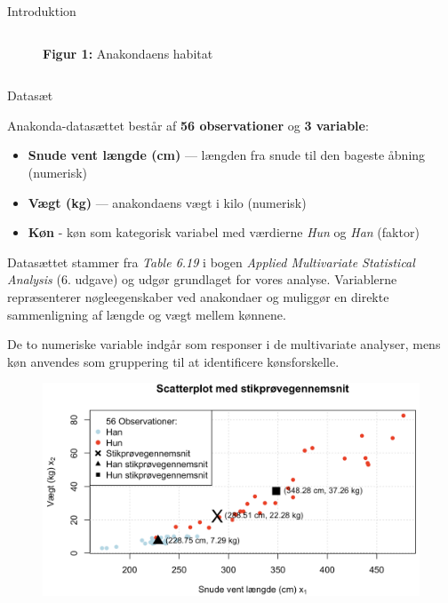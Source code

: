\documentclass[final]{beamer}
\newlength{\colwidth}
\begin{document}
\begin{frame}[t]
\begin{columns}[t]
\begin{column}{\colwidth}
\begin{block}{Introduktion}
\begin{columns}
\begin{column}{0.55\textwidth}
\begin{figure}
      \textbf{\textcolor{junglegreen}{Figur 1:}} Anakondaens habitat
    \end{figure}
  \end{column}



  
\end{columns}
	
  \end{block}
  
  
\vspace{-1em}
\begin{block}{Datasæt}
\justifying

Anakonda-datasættet består af \textbf{56 observationer} og \textbf{3 variable}:


\begin{itemize}
	\item \textbf{Snude vent længde (cm)} — længden fra snude til den bageste åbning  (numerisk)
	\item \textbf{Vægt (kg)} — anakondaens vægt i kilo (numerisk)
	\item \textbf{Køn} - køn som kategorisk variabel med værdierne \textit{Hun} og \textit{Han} (faktor)
\end{itemize}

Datasættet stammer fra \textit{Table 6.19} i bogen \textit{Applied Multivariate Statistical Analysis} (6. udgave) og udgør grundlaget for vores analyse. Variablerne repræsenterer nøgleegenskaber ved anakondaer og muliggør en direkte sammenligning af længde og vægt mellem kønnene.

\vspace{1em}

De to numeriske variable indgår som responser i de multivariate analyser, mens køn anvendes som gruppering til at identificere kønsforskelle.

	\begin{figure}[h!]
	\centering
	\includegraphics[width=0.80\linewidth]{plots/scatter_final5.png}
	

\end{figure}
\end{block}
\end{column}
\end{columns}
\end{frame}
\end{document}
